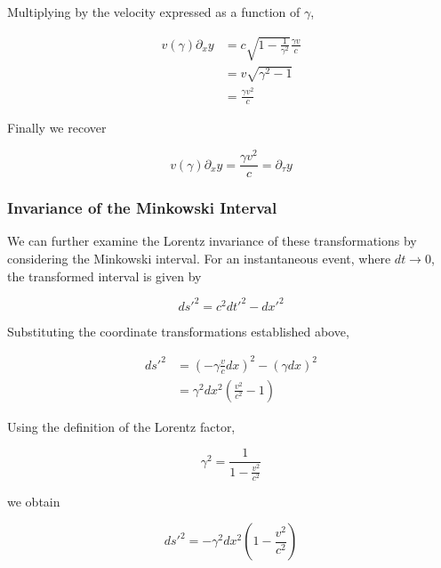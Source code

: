 \documentclass[pdflatex,sn-mathphys-num]{sn-jnl}%
\theoremstyle{thmstyleone}%
\theoremstyle{thmstyletwo}%
\theoremstyle{thmstylethree}%
\begin{document}
Multiplying by the velocity expressed as a function of $\gamma$,

\begin{equation}
\begin{aligned}
    v(\gamma)\partial_x y
    &=
    c\sqrt{1-\frac{1}{\gamma^2}}
    \frac{\gamma v}{c}
    \\[6pt]
    &=
    v\sqrt{\gamma^2-1}
    \\[6pt]
    &=
    \frac{\gamma v^2}{c}
\end{aligned}
\end{equation}

Finally we recover

\begin{equation}
    \boxed{
    v(\gamma)\partial_x y
    =
    \frac{\gamma v^2}{c}
    =
    \partial_\tau y
    }
\end{equation}

\subsubsection{Invariance of the Minkowski Interval}

We can further examine the Lorentz invariance of these transformations by considering the Minkowski interval. For an instantaneous event, where $dt \to 0$, the transformed interval is given by

\begin{equation}
    ds'^2 = c^2dt'^2 - dx'^2
\end{equation}

Substituting the coordinate transformations established above,

\begin{equation}
\begin{aligned}
    ds'^2
    &=
    \left(-\gamma\frac{v}{c}dx\right)^2
    -
    \left(\gamma dx\right)^2
    \\[6pt]
    &=
    \gamma^2 dx^2
    \left(\frac{v^2}{c^2}-1\right)
\end{aligned}
\end{equation}

Using the definition of the Lorentz factor,

\begin{equation}
    \gamma^2 =
    \frac{1}{1-\frac{v^2}{c^2}}
\end{equation}

we obtain

\begin{equation}
    ds'^2
    =
    -\gamma^2 dx^2
    \left(1-\frac{v^2}{c^2}\right)
\end{equation}
\end{document}
